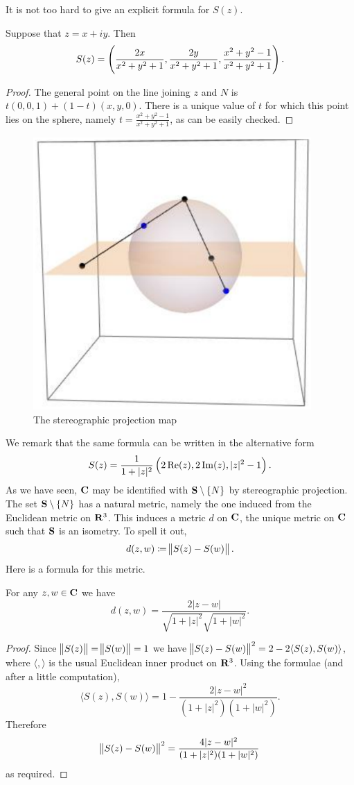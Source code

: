 It is not too hard to give an explicit formula for $S(z)$.

\begin{lemma}
Suppose that $z=x+iy$. Then
\[S(z)=\left(\frac{2x}{x^2+y^2+1},\frac{2y}{x^2+y^2+1},\frac{x^2+y^2-1}{x^2+y^2+1}\right).\]
\end{lemma}

\begin{proof}
The general point on the line joining $z$ and $N$ is $t(0,0,1)+(1-t)(x,y,0)$. There is a unique value of $t$ for which this point lies on the sphere, namely $t=\frac{x^2+y^2-1}{x^2+y^2+1}$, as can be easily checked.
\end{proof}

\begin{figure}[H]
\centering
\includegraphics[width=0.5\linewidth]{images/stereographic-projection-map.png}
\caption{The stereographic projection map}
\end{figure}

We remark that the same formula can be written in the alternative form
\[S(z)=\frac{1}{1+|z|^2}\left(2\Re(z),2\Im(z),|z|^2-1\right).\]
As we have seen, $\mathbf C$ may be identified with $\mathbf S\setminus\{N\}$ by stereographic projection. The set $\mathbf S\setminus\{N\}$ has a natural metric, namely the one induced from the Euclidean metric on $\mathbf R^3$. This induces a metric $d$ on $\mathbf C$, the unique metric on $\mathbf C$ such that $\mathbf S$ is an isometry. To spell it out,
\[d(z,w)\coloneqq\norm{S(z)-S(w)}.\]
Here is a formula for this metric.
\begin{lemma}
For any $z,w\in\mathbf C$ we have
\[d(z,w)=\frac{2|z-w|}{\sqrt{1+|z|^2}\sqrt{1+|w|^2}}.\]
\end{lemma}

\begin{proof}
Since $\norm{S(z)}=\norm{S(w)}=1$ we have $\norm{S(z)-S(w)}^2=2-2\langle S(z),S(w)\rangle$, where $\langle,\rangle$ is the usual Euclidean inner product on $\mathbf R^3$. Using the formulae (and after a little computation),
\[\langle S(z),S(w)\rangle=1-\frac{2|z-w|^2}{(1+|z|^2)(1+|w|^2)}.\]
Therefore
\[\norm{S(z)-S(w)}^2=\frac{4|z-w|^2}{(1+|z|^2)(1+|w|^2)}\]
as required.
\end{proof}

